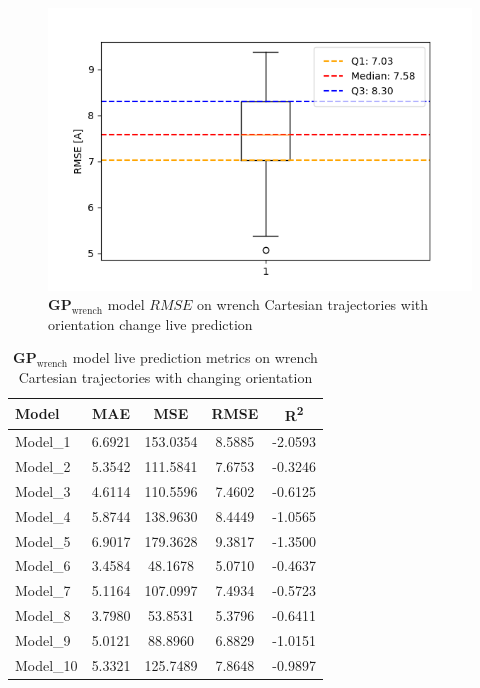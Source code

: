     \begin{figure}[H]
    \centering
    \includegraphics[width=1\columnwidth]{Images/05_results/wrench_boxplot_live_OC_RMSE.png}
    \caption[\(\boldsymbol{GP}_{\text{wrench}}\) model \(RMSE\) on wrench Cartesian trajectories with orientation change live prediction]{\(\boldsymbol{GP}_{\text{wrench}}\) model \(RMSE\) on wrench Cartesian trajectories with orientation change live prediction}
    \label{fig:wrench_oc_RMSE_live}
    \end{figure}

    
    \begin{table}[H]
    \centering
    \begin{tabular}{lcccc}
    \toprule
    \textbf{Model} & \textbf{MAE} & \textbf{MSE} & \textbf{RMSE} & \textbf{R\textsuperscript{2}} \\
    \midrule
    Model\_1 & 6.6921 & 153.0354 & 8.5885 & -2.0593 \\
    Model\_2 & 5.3542 & 111.5841 & 7.6753 & -0.3246 \\
    Model\_3 & 4.6114 & 110.5596 & 7.4602 & -0.6125 \\
    Model\_4 & 5.8744 & 138.9630 & 8.4449 & -1.0565 \\
    Model\_5 & 6.9017 & 179.3628 & 9.3817 & -1.3500 \\
    Model\_6 & 3.4584 & 48.1678 & 5.0710 & -0.4637 \\
    Model\_7 & 5.1164 & 107.0997 & 7.4934 & -0.5723 \\
    Model\_8 & 3.7980 & 53.8531 & 5.3796 & -0.6411 \\
    Model\_9 & 5.0121 & 88.8960 & 6.8829 & -1.0151 \\
    Model\_10 & 5.3321 & 125.7489 & 7.8648 & -0.9897 \\
    \bottomrule
    \end{tabular}
    \caption{\(\boldsymbol{GP}_{\text{wrench}}\) model live prediction metrics on wrench Cartesian trajectories with changing orientation}
    \end{table}


